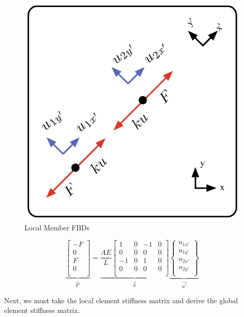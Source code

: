 \begin{center}
	\begin{figure}[h]	\centerline{\includegraphics[width=0.7\columnwidth]{Figures/LocalMemberStiffness}}
		\caption{Local Member FBDs}
		\label{fig:LocalMemberStiffness}
	\end{figure}
\end{center}


\begin{equation}
	\underbrace{
		\begin{bmatrix}
			-F\\ 0\\ F\\ 0\\
		\end{bmatrix}
	}_{\vec{F}'}
	=
	\underbrace{
		\frac{AE}{L}
		\begin{bmatrix}
			1 & 0 & -1 & 0\\
			0 & 0 & 0 & 0\\
			-1 & 0 & 1 & 0\\
			0 & 0 & 0 & 0\\
		\end{bmatrix}
	}_{\vec{k}}
	\underbrace{
		\begin{Bmatrix}
			u_{1x'}\\ u_{1y'}\\ u_{2x'}\\ u_{2y'}\\
		\end{Bmatrix}
	}_{\vec{u'}}
	\label{Eq:F=ku}
\end{equation}

Next, we must take the local element stiffness matrix and derive the global element stiffness matrix.

